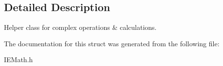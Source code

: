 \subsection{Detailed Description}
Helper class for complex operations \& calculations. 



The documentation for this struct was generated from the following file\+:\begin{DoxyCompactItemize}
\item 
I\+E\+Math.\+h\end{DoxyCompactItemize}
